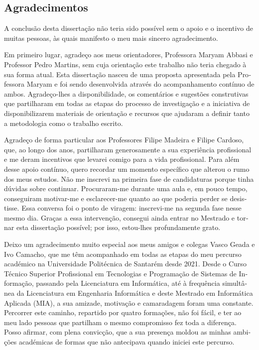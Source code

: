 
\begin{otherlanguage}{portuguese}

\chapter*{Agradecimentos}

A conclusão desta dissertação não teria sido possível sem o apoio e o incentivo de muitas pessoas, às quais manifesto o meu mais sincero agradecimento.

Em primeiro lugar, agradeço aos meus orientadores, Professora Maryam Abbasi e Professor Pedro Martins, sem cuja orientação este trabalho não teria chegado à sua forma atual. Esta dissertação nasceu de uma proposta apresentada pela Professora Maryam e foi sendo desenvolvida através do acompanhamento contínuo de ambos. Agradeço-lhes a disponibilidade, os comentários e sugestões construtivas que partilharam em todas as etapas do processo de investigação e a iniciativa de disponibilizarem materiais de orientação e recursos que ajudaram a definir tanto a metodologia como o trabalho escrito.

Agradeço de forma particular aos Professores Filipe Madeira e Filipe Cardoso, que, ao longo dos anos, partilharam generosamente a sua experiência profissional e me deram incentivos que levarei comigo para a vida profissional. Para além desse apoio contínuo, quero recordar um momento específico que alterou o rumo dos meus estudos. Não me inscrevi na primeira fase de candidaturas porque tinha dúvidas sobre continuar. Procuraram-me durante uma aula e, em pouco tempo, conseguiram motivar-me e esclarecer-me quanto ao que poderia perder se desistisse. Essa conversa foi o ponto de viragem: inscrevi-me na segunda fase nesse mesmo dia. Graças a essa intervenção, consegui ainda entrar no Mestrado e tornar esta dissertação possível; por isso, estou-lhes profundamente grato.

Deixo um agradecimento muito especial aos meus amigos e colegas Vasco Geada e Ivo Camacho, que me têm acompanhado em todas as etapas do meu percurso académico na Universidade Politécnica de Santarém desde 2021. Desde o Curso Técnico Superior Profissional em Tecnologias e Programação de Sistemas de Informação, passando pela Licenciatura em Informática, até à frequência simultânea da Licenciatura em Engenharia Informática e deste Mestrado em Informática Aplicada (MIA), a sua amizade, motivação e camaradagem foram uma constante. Percorrer este caminho, repartido por quatro formações, não foi fácil, e ter ao meu lado pessoas que partilham o mesmo compromisso fez toda a diferença. Posso afirmar, com plena convicção, que a sua presença moldou as minhas ambições académicas de formas que não antecipava quando iniciei este percurso.

\end{otherlanguage}
